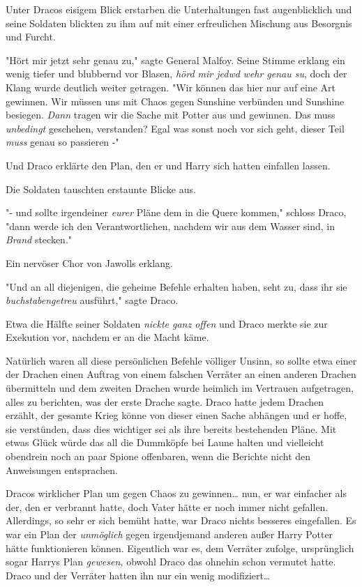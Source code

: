 {Unter Dracos eisigem Blick erstarben die Unterhaltungen fast augenblicklich und seine Soldaten blickten zu ihm auf mit einer erfreulichen Mischung aus Besorgnis und Furcht.

"Hört mir jetzt sehr genau zu," sagte General Malfoy. Seine Stimme erklang ein wenig tiefer und blubbernd vor Blasen, \emph{hörd mir jedwd} \emph{wehr genau su}, doch der Klang wurde deutlich weiter getragen. "Wir können das hier nur auf eine Art gewinnen. Wir müssen uns mit Chaos gegen Sunshine verbünden und Sunshine besiegen. \emph{Dann} tragen wir die Sache mit Potter aus und gewinnen. Das muss \emph{unbedingt} geschehen, verstanden? Egal was sonst noch vor sich geht, dieser Teil \emph{muss} genau so passieren -"

Und Draco erklärte den Plan, den er und Harry sich hatten einfallen lassen.

Die Soldaten tauschten erstaunte Blicke aus.

"- und sollte irgendeiner \emph{eurer} Pläne dem in die Quere kommen," schloss Draco, "dann werde ich den Verantwortlichen, nachdem wir aus dem Wasser sind, in \emph{Brand} stecken."

Ein nervöser Chor von Jawolls erklang.

"Und an all diejenigen, die geheime Befehle erhalten haben, seht zu, dass ihr sie \emph{buchstabengetreu} ausführt," sagte Draco.

Etwa die Hälfte seiner Soldaten \emph{nickte ganz offen} und Draco merkte sie zur Exekution vor, nachdem er an die Macht käme.

Natürlich waren all diese persönlichen Befehle völliger Unsinn, so sollte etwa einer der Drachen einen Auftrag von einem falschen Verräter an einen anderen Drachen übermitteln und dem zweiten Drachen wurde heimlich im Vertrauen aufgetragen, alles zu berichten, was der erste Drache sagte. Draco hatte jedem Drachen erzählt, der gesamte Krieg könne von dieser einen Sache abhängen und er hoffe, sie verstünden, dass dies wichtiger sei als ihre bereits bestehenden Pläne. Mit etwas Glück würde das all die Dummköpfe bei Laune halten und vielleicht obendrein noch an paar Spione offenbaren, wenn die Berichte nicht den Anweisungen entsprachen.

Dracos wirklicher Plan um gegen Chaos zu gewinnen… nun, er war einfacher als der, den er verbrannt hatte, doch Vater hätte er noch immer nicht gefallen. Allerdings, so sehr er sich bemüht hatte, war Draco nichts besseres eingefallen. Es war ein Plan der \emph{unmöglich} gegen irgendjemand anderen außer Harry Potter hätte funktionieren können. Eigentlich war es, dem Verräter zufolge, ursprünglich sogar Harrys Plan \emph{gewesen,} obwohl Draco das ohnehin schon vermutet hatte. Draco und der Verräter hatten ihn nur ein wenig modifiziert…

}
